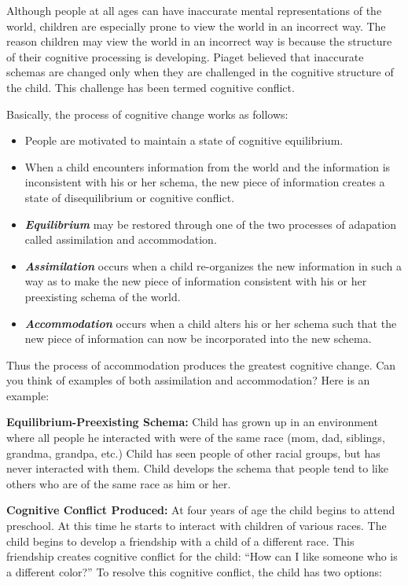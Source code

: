 \documentclass[
]{book}
\providecommand{\tightlist}{%
  \setlength{\itemsep}{0pt}\setlength{\parskip}{0pt}}
\begin{document}
Although people at all ages can have inaccurate mental representations of the world, children are especially prone to view the world in an incorrect way. The reason children may view the world in an incorrect way is because the structure of their cognitive processing is developing. Piaget believed that inaccurate schemas are changed only when they are challenged in the cognitive structure of the child. This challenge has been termed cognitive conflict.

Basically, the process of cognitive change works as follows:

\begin{itemize}
\tightlist
\item
  People are motivated to maintain a state of cognitive equilibrium.\\
\item
  When a child encounters information from the world and the information is inconsistent with his or her schema, the new piece of information creates a state of disequilibrium or cognitive conflict.\\
\item
  \textbf{\emph{Equilibrium}} may be restored through one of the two processes of adapation called assimilation and accommodation.\\
\item
  \textbf{\emph{Assimilation}} occurs when a child re-organizes the new information in such a way as to make the new piece of information consistent with his or her preexisting schema of the world.\\
\item
  \textbf{\emph{Accommodation}} occurs when a child alters his or her schema such that the new piece of information can now be incorporated into the new schema.
\end{itemize}

Thus the process of accommodation produces the greatest cognitive change. Can you think of examples of both assimilation and accommodation? Here is an example:

\textbf{Equilibrium-Preexisting Schema:} Child has grown up in an environment where all people he interacted with were of the same race (mom, dad, siblings, grandma, grandpa, etc.) Child has seen people of other racial groups, but has never interacted with them. Child develops the schema that people tend to like others who are of the same race as him or her.

\textbf{Cognitive Conflict Produced:} At four years of age the child begins to attend preschool. At this time he starts to interact with children of various races. The child begins to develop a friendship with a child of a different race. This friendship creates cognitive conflict for the child: ``How can I like someone who is a different color?'' To resolve this cognitive conflict, the child has two options:
\end{document}

